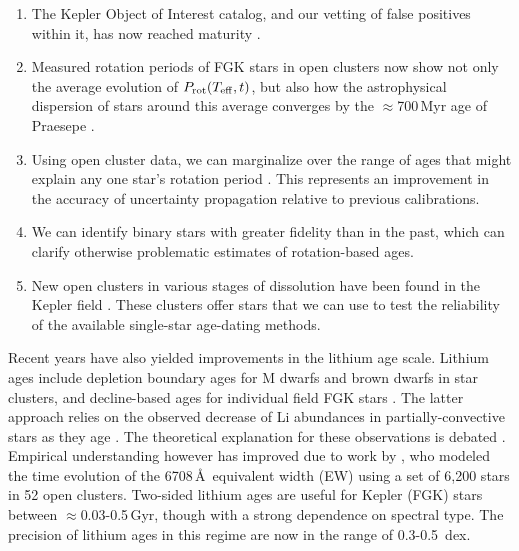 \documentclass[11pt,twocolumn,tighten,linenumbers,trackchanges]{aastex63}
\begin{document}
\begin{enumerate}[label={\it \roman*)},leftmargin=12pt,topsep=0pt,itemsep=-1ex,partopsep=1ex,parsep=1ex]
  \item The Kepler Object of Interest catalog, and our vetting of
    false positives within it, has now reached maturity
    \citep[e.g.][]{Thompson_2018}.
  \item Measured rotation periods of FGK stars in open clusters now
    show not only the average evolution of $P_{\rm rot}(T_{\rm
    eff},t)$, but also how the astrophysical dispersion of stars
    around this average converges by the $\approx$700\,Myr age of
    Praesepe
    \citep[e.g.][]{Curtis_2019_ngc6811,Gillen_2020,Rampalli_2021,Fritzewski_2021,Rebull_2022,Dungee_2022,2023AJ....166...14B}.
  \item Using open cluster data, we can marginalize over the range of
    ages that might explain any one star's rotation period
    \citep{Bouma_2023}.  This represents an improvement in the
    accuracy of uncertainty propagation relative to previous
    calibrations.
  \item We can identify binary stars with greater fidelity than
    in the past, which can clarify otherwise problematic estimates of
    rotation-based ages.
  \item New open clusters in various stages of dissolution have been
    found in the Kepler field
    \cite[e.g.][]{2019AJ....158..122K,Kerr_2021,Barber_2022}.
    These clusters offer stars that we can use to test
    the reliability of the available single-star age-dating methods.
\end{enumerate}

Recent years have also yielded improvements in the
lithium age scale.  Lithium ages include depletion boundary ages for M
dwarfs and brown dwarfs in star clusters, and decline-based ages for
individual field FGK stars \citep{Soderblom_2010}.  The latter
approach relies on the observed decrease of Li abundances in
partially-convective stars as they age
\citep[e.g.][]{2005A&A...442..615S}.  The theoretical explanation for
these observations is debated
\citep[e.g.][]{1995ApJ...441..865C,2010ApJ...716.1269D,2019MNRAS.485.4052C}.
Empirical understanding however has improved due to work by
\citet{Jeffries_2023}, who modeled the time evolution of the
 6708\,\AA\ equivalent width (EW) using a set of 6{,}200
stars in 52 open clusters.  Two-sided lithium ages are useful for
Kepler (FGK) stars between $\approx$0.03-0.5\,Gyr, though with a
strong dependence on spectral type.  The precision of lithium ages in
this regime are now in the range of 0.3-0.5~dex.
\end{document}
